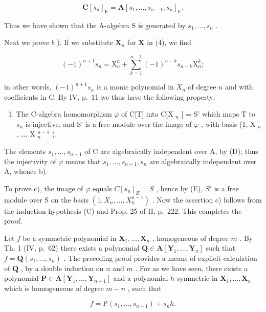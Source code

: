 \[
\mathbf {C} \left[ s _ {n} \right] _ {\mathrm{E}} = \mathbf {A} \left[ s _ {1}, \dots , s _ {n - 1}, s _ {n} \right] _ {\mathrm{E}}.
\]

Thus we have shown that the A-algebra S is generated by \(s_{1}, \ldots, s_{n}\) .

Next we prove \(b\) ). If we substitute \(\mathbf{X}_n\) for \(\mathbf{X}\) in (4), we find

\[
(- 1) ^ {n + 1} s _ {n} = \mathrm{X} _ {n} ^ {n} + \sum_ {k = 1} ^ {n - 1} (- 1) ^ {n - k} s _ {n - k} \mathrm{X} _ {n} ^ {k};
\]

in other words, \((-1)^{n + 1}s_n\) is a monic polynomial in \(X_{n}\) of degree \(n\) and with coefficients in C. By IV, p.~11 we thus have the following property:

\begin{enumerate}
\def\labelenumi{(\Alph{enumi})}
\setcounter{enumi}{4}
\tightlist
\item
  The C-algebra homomorphism \(\varphi\) of C{[}T{]} into C{[}X \(_n\) {]} = S' which maps T to \(s_n\) is injective, and S' is a free module over the image of \(\varphi\) , with basis (1, X \(_n\) , \ldots, X \(_n^{n-1}\) ).
\end{enumerate}

The elements \(s_{1}, \ldots, s_{n-1}\) of C are algebraically independent over A, by (D); thus the injectivity of \(\varphi\) means that \(s_{1}, \ldots, s_{n-1}, s_{n}\) are algebraically independent over A, whence b).

To prove c), the image of \(\varphi\) equals \(C[s_{n}]_{E} = S\) , hence by (E), \(S'\) is a free module over S on the basis \((1, X_{n}, ..., X_{n}^{n-1})\) . Now the assertion c) follows from the induction hypothesis (C) and Prop. 25 of II, p.~222. This completes the proof.

Let \(f\) be a symmetric polynomial in \(\mathbf{X}_1, \ldots, \mathbf{X}_n\) , homogeneous of degree \(m\) . By Th. 1 (IV, p.~62) there exists a polynomial \(\mathbf{Q} \in \mathbf{A}[\mathbf{Y}_1, \ldots, \mathbf{Y}_n]\) such that \(f = \mathbf{Q}(s_1, \ldots, s_n)\) . The preceding proof provides a means of explicit calculation of \(\mathbf{Q}\) , by a double induction on \(n\) and \(m\) . For as we have seen, there exists a polynomial \(\mathbf{P} \in \mathbf{A}[\mathbf{Y}_1, \ldots, \mathbf{Y}_{n-1}]\) and a polynomial \(h\) symmetric in \(\mathbf{X}_1, \ldots, \mathbf{X}_n\) which is homogeneous of degree \(m - n\) , such that

\[
f = \mathrm{P} (s _ {1}, \dots , s _ {n - 1}) + s _ {n} h.\tag{8}
\]

